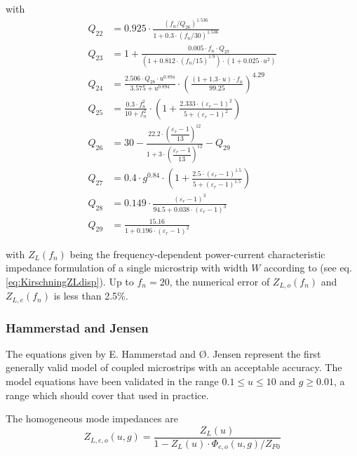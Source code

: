 with
\begin{align}
Q_{22} &= 0.925\cdot \frac{ \left( f_n/Q_{26} \right) ^{1.536} }
                         { 1+0.3\cdot \left( f_n/30 \right)^{1.536} }\\
Q_{23} &= 1+ \frac{ 0.005\cdot f_n\cdot Q_{27} }
                 { \left( 1+0.812\cdot\left( f_n/15 \right) ^{1.9} \right) \cdot
		   \left(1 + 0.025\cdot u^2\right) }\\
Q_{24} &= \frac{2.506\cdot Q_{28}\cdot u^{0.894}}{3.575+u^{0.894}} \cdot
         \left( \frac{ (1+1.3\cdot u)\cdot f_n}{99.25} \right)^{4.29}\\
Q_{25} &= \frac{0.3\cdot f_n^2}{10+f_n^2}\cdot
         \left( 1+ \frac{2.333\cdot \left(\varepsilon_r-1\right)^2}{5+\left(\varepsilon_r-1\right)^2} \right)\\
Q_{26} &= 30 - \frac{ 22.2\cdot \left( \dfrac{\varepsilon_r-1}{13} \right)^{12} }
                   { 1+ 3\cdot \left( \dfrac{\varepsilon_r-1}{13} \right)^{12} } - Q_{29}\\
Q_{27} &= 0.4\cdot g^{0.84}\cdot \left( 1+
         \frac{2.5\cdot \left(\varepsilon_r-1\right)^{1.5}}{5+\left(\varepsilon_r-1\right)^{1.5}} \right)\\
Q_{28} &= 0.149\cdot \frac{\left(\varepsilon_r-1\right)^3}{94.5+0.038\cdot \left(\varepsilon_r-1\right)^3}\\
Q_{29} &= \frac{15.16}{1+0.196\cdot \left(\varepsilon_r-1\right)^2}
\end{align}

with $Z_L(f_n)$ being the frequency-dependent power-current
characteristic impedance formulation of a single microstrip with width
$W$ according to \cite{Kirschning1} (see
eq. \eqref{eq:KirschningZLdisp}).  Up to $f_n=20$, the numerical error
of $Z_{L,o}(f_n)$ and $Z_{L,e}(f_n)$ is less than 2.5\%.

\subsubsection{Hammerstad and Jensen}

The equations given by E. Hammerstad and {\O}. Jensen
\cite{Hammerstad} represent the first generally valid model of coupled
microstrips with an acceptable accuracy.  The model equations have
been validated in the range $0.1 \le u \le 10$ and $g \ge 0.01$, a
range which should cover that used in practice.

\addvspace{12pt}

The homogeneous mode impedances are
\begin{equation}
\label{eq:HandJZLeo}
Z_{L,e,o}\left(u, g\right) = \dfrac{Z_{L}(u)}{1 - Z_{L}(u)\cdot \Phi_{e,o}\left(u,g\right) / Z_{F0}}
\end{equation}

